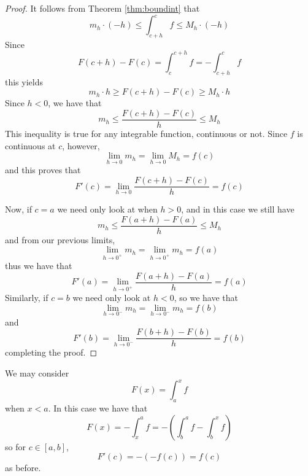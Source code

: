 \documentclass[12pt, a4paper, oneside, openright, titlepage]{book}
\begin{document}
\begin{proof}
    It follows from Theorem \ref{thm:boundint} that \begin{equation*}
        m_h\cdot (-h)\leq \int_{c+h}^{c}f \leq M_h\cdot (-h)
    \end{equation*}
    Since \begin{equation*}
        F(c+h) - F(c) = \int_c^{c+h}f = -\int_{c+h}^cf
    \end{equation*}
    this yields \begin{equation*}
        m_h\cdot h\geq F(c+h) - F(c) \geq M_h\cdot h
    \end{equation*}
    Since $h < 0$, we have that \begin{equation*}
        m_h \leq \frac{F(c+h) - F(c)}{h} \leq M_h
    \end{equation*}
    This inequality is true for any integrable function, continuous or not. Since $f$ is continuous at $c$, however, \begin{equation*}
        \lim\limits_{h\rightarrow 0}m_h = \lim\limits_{h\rightarrow 0}M_h = f(c)
    \end{equation*}
    and this proves that \begin{equation*}
        F'(c) = \lim\limits_{h\rightarrow 0}\frac{F(c+h) - F(c)}{h} = f(c)
    \end{equation*}


    Now, if $c = a$ we need only look at when $h > 0$, and in this case we still have  \begin{equation*}
        m_h \leq \frac{F(a+h) - F(a)}{h} \leq M_h
    \end{equation*}
    and from our previous limits, \begin{equation*}
        \lim\limits_{h\rightarrow 0^+}m_h = \lim\limits_{h\rightarrow 0^+}m_h = f(a)
    \end{equation*}
    thus we have that $$F'(a) = \lim\limits_{h\rightarrow 0^+}\frac{F(a+h)-F(a)}{h} = f(a)$$
    Similarly, if $c = b$ we need only look at $h < 0$, so we have that \begin{equation*}
        \lim\limits_{h\rightarrow 0^-}m_h = \lim\limits_{h\rightarrow 0^-}m_h = f(b)
    \end{equation*}
    and $$F'(b) = \lim\limits_{h\rightarrow 0^-}\frac{F(b+h)-F(b)}{h} = f(b)$$
    completing the proof.
\end{proof}


\begin{rmk}
    We may consider \begin{equation}
        F(x) = \int_a^xf
    \end{equation}
    when $x < a$. In this case we have that \begin{equation}
        F(x) = -\int_x^af = -\left(\int_b^af - \int_b^xf\right)
    \end{equation}
    so for $c \in [a,b]$, \begin{equation}
        F'(c) = -(-f(c)) = f(c)
    \end{equation}
    as before.
\end{rmk}
\end{document}
